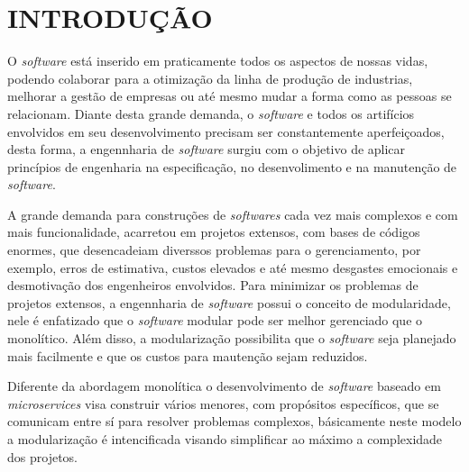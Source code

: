 \setcounter{page}{1}
\chapter{INTRODU\c{C}\~AO}  %
\label{chap:01}

O \textit{software} está inserido em praticamente todos os aspectos de nossas vidas, podendo colaborar para a otimização da linha de produção de industrias, melhorar a gestão de empresas ou até mesmo mudar a forma como as pessoas se relacionam. Diante desta grande demanda, o \textit{software} e todos os artifícios envolvidos em seu desenvolvimento precisam ser constantemente aperfeiçoados, desta forma, a engennharia de \textit{software} surgiu com o objetivo de aplicar princípios de engenharia na especificação, no desenvolimento e na manutenção de \textit{software}.

A grande demanda para construções de \textit{softwares} cada vez mais complexos e com mais funcionalidade, acarretou em projetos extensos, com bases de códigos enormes, que desencadeiam diverssos problemas para o gerenciamento, por exemplo, erros de estimativa, custos elevados e até mesmo desgastes emocionais e desmotivação dos engenheiros envolvidos. Para minimizar os problemas de projetos extensos, a engennharia de \textit{software} possui o conceito de modularidade, nele é enfatizado que o \textit{software} modular pode ser melhor gerenciado que o monolítico. Além disso, a modularização possibilita que o \textit{software} seja planejado mais facilmente e que os custos para mautenção sejam reduzidos.

Diferente da abordagem monolítica o desenvolvimento de \textit{software} baseado em \textit{microservices} visa construir vários  menores, com propósitos específicos, que se comunicam entre sí para resolver problemas complexos, básicamente neste modelo a modularização é intencificada visando simplificar ao máximo a complexidade dos projetos. 